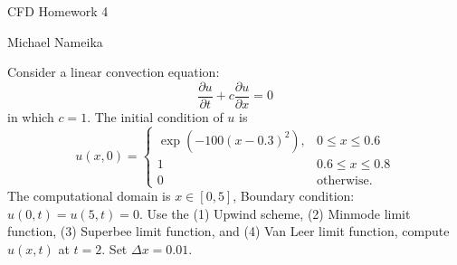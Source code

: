 \documentclass{article}
\begin{document}
\begin{center}
    {\huge CFD Homework 4}
    \vspace{0.5cm}

    {\large Michael Nameika}
\end{center}
Consider a linear convection equation:
\[\frac{\partial u}{\partial t} + c\frac{\partial u}{\partial x} = 0\]
in which $c = 1.$ The initial condition of $u$ is 
\[u(x,0) = \begin{cases}
    \exp(-100(x - 0.3)^2), & 0 \leq x \leq 0.6\\
    1 & 0.6 \leq x \leq 0.8\\
    0 & \text{otherwise}.
\end{cases}\]
The computational domain is $x \in [0, 5]$, Boundary condition: $u(0,t) = u(5,t) = 0$. 
\newline
Use the (1) Upwind scheme, (2) Minmode limit function, (3) Superbee limit function, and (4) Van Leer limit function, compute $u(x,t)$ at $t = 2$. Set $\Delta x = 0.01$.
\end{document}
